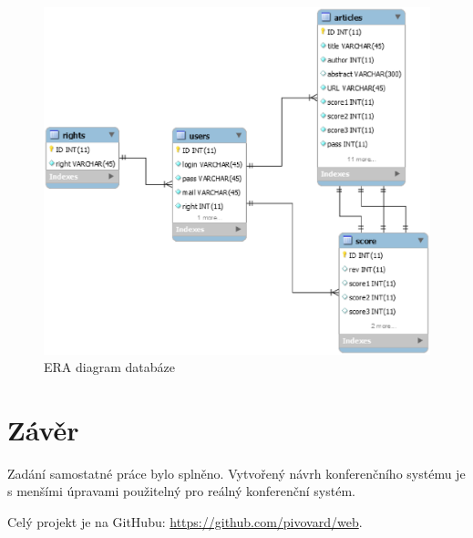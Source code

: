 \begin{figure}[H]
	\centering
	\includegraphics[width=1\textwidth]{img/web_sp_EER.eps}
	\caption{ERA diagram databáze}
  \label{eer}
\end{figure}





\chapter{Závěr}

Zadání samostatné práce bylo splněno. Vytvořený návrh konferenčního systému je s menšími úpravami použitelný pro reálný konferenční systém.

Celý projekt je na GitHubu: \url{https://github.com/pivovard/web}.
